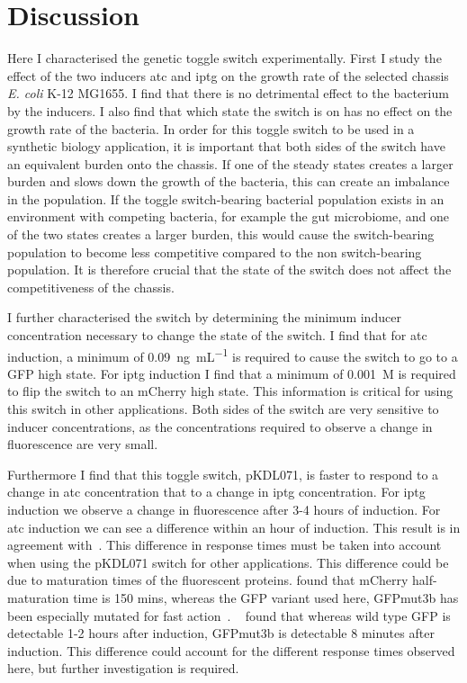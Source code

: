 \section{Discussion}

Here I characterised the genetic toggle switch experimentally. First I study the effect of the two inducers \acrshort{atc} and \acrshort{iptg} on the growth rate of the selected chassis \textit{E. coli} K-12 MG1655. I find that there is no detrimental effect to the bacterium by the inducers. I also find that which state the switch is on has no effect on the growth rate of the bacteria. In order for this toggle switch to be used in a synthetic biology application, it is important that both sides of the switch have an equivalent burden onto the chassis. If one of the steady states creates a larger burden and slows down the growth of the bacteria, this can create an imbalance in the population. If the toggle switch-bearing bacterial population exists in an environment with competing bacteria, for example the gut microbiome, and one of the two states creates a larger burden, this would cause the switch-bearing population to become less competitive compared to the non switch-bearing population. It is therefore crucial that the state of the switch does not affect the competitiveness of the chassis.  


I further characterised the switch by determining the minimum inducer concentration necessary to change the state of the switch. I find that for \acrshort{atc} induction, a minimum of \SI{0.09}{\nano\gram\per\milli\liter} is required to cause the switch to go to a GFP high state. For \acrshort{iptg} induction I find that a minimum of \SI{0.001}{M} is required to flip the switch to an mCherry high state. This information is critical for using this switch in other applications. Both sides of the switch are very sensitive to inducer concentrations, as the concentrations required to observe a change in fluorescence are very small. 

Furthermore I find that this toggle switch, pKDL071, is faster to respond to a change in \acrshort{atc} concentration that to a change in \acrshort{iptg} concentration. For \acrshort{iptg} induction we observe a change in fluorescence after 3-4 hours of induction. For \acrshort{atc} induction we can see a difference within an hour of induction. This result is in agreement with~\textcite{Litcofsky:2012gr}. This difference in response times must be taken into account when using the pKDL071 switch for other applications. This difference could be due to maturation times of the fluorescent proteins. \textcite{Macdonald:2012el} found that mCherry half-maturation time is 150 mins, whereas the GFP variant used here, GFPmut3b has been especially mutated for fast action~\autocite{Cormack:1996gv}. ~\textcite{Cormack:1996gv} found that whereas wild type GFP is detectable 1-2 hours after induction, GFPmut3b is detectable 8 minutes after induction. This difference could account for the different response times observed here, but further investigation is required. 


